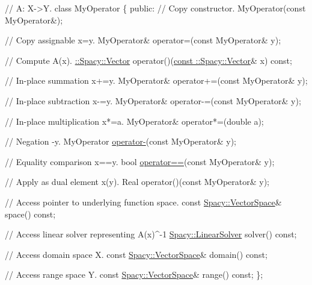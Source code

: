 \begin{DoxyCode}
\textcolor{comment}{// A: X->Y.}
\textcolor{keyword}{class }MyOperator
\{
\textcolor{keyword}{public}:
  \textcolor{comment}{// Copy constructor.}
  MyOperator(\textcolor{keyword}{const} MyOperator&);

  \textcolor{comment}{// Copy assignable x=y.}
  MyOperator& operator=(\textcolor{keyword}{const} MyOperator& y);

  \textcolor{comment}{// Compute A(x).}
  \hyperlink{classSpacy_1_1Vector}{::Spacy::Vector} operator()(\hyperlink{group__VectorSpaceGroup_gafda42fd5aa3f7597a42b9831bf4dfd07}{const ::Spacy::Vector}& x) \textcolor{keyword}{const};

  \textcolor{comment}{// In-place summation x+=y.}
  MyOperator& operator+=(\textcolor{keyword}{const} MyOperator& y);

  \textcolor{comment}{// In-place subtraction x-=y.}
  MyOperator& operator-=(\textcolor{keyword}{const} MyOperator& y);

  \textcolor{comment}{// In-place multiplication x*=a.}
  MyOperator& operator*=(\textcolor{keywordtype}{double} a);

  \textcolor{comment}{// Negation -y.}
  MyOperator \hyperlink{namespaceSpacy_a8bc98f51c7beab86185bf97a29b36395}{operator-}(\textcolor{keyword}{const} MyOperator& y);

  \textcolor{comment}{// Equality comparison x==y.}
  \textcolor{keywordtype}{bool} \hyperlink{namespaceSpacy_aef4930427aac4c8089b4c43b1c97cf25}{operator==}(\textcolor{keyword}{const} MyOperator& y);

  \textcolor{comment}{// Apply as dual element x(y).}
  Real operator()(\textcolor{keyword}{const} MyOperator& y);

  \textcolor{comment}{// Access pointer to underlying function space.}
  \textcolor{keyword}{const} \hyperlink{classSpacy_1_1VectorSpace}{Spacy::VectorSpace}& space() \textcolor{keyword}{const};

  \textcolor{comment}{// Access linear solver representing A(x)^-1}
 \hyperlink{namespaceSpacy_a4cd614ddb41dd29e68a723dadd5602f2}{Spacy::LinearSolver} solver() \textcolor{keyword}{const};

  \textcolor{comment}{// Access domain space X.}
  \textcolor{keyword}{const} \hyperlink{classSpacy_1_1VectorSpace}{Spacy::VectorSpace}& domain() \textcolor{keyword}{const};

  \textcolor{comment}{// Access range space Y.}
  \textcolor{keyword}{const} \hyperlink{classSpacy_1_1VectorSpace}{Spacy::VectorSpace}& range() \textcolor{keyword}{const};
\};
\end{DoxyCode}


